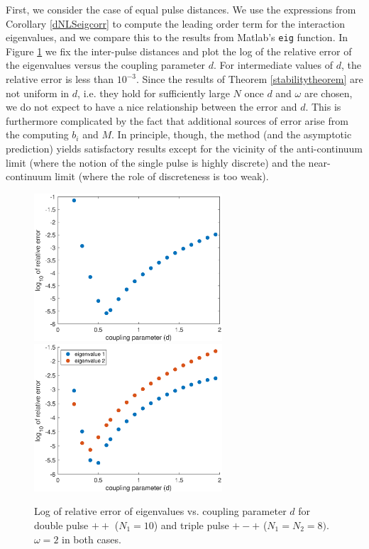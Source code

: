 \documentclass[12pt]{article}
\begin{document}
First, we consider the case of equal pulse distances. We use the expressions from Corollary \ref{dNLSeigcorr} to compute the leading order term for the interaction eigenvalues, and we compare this to the results from Matlab's \texttt{eig} function. In Figure \ref{fig:error1} we fix the inter-pulse distances and plot the log of the relative error of the eigenvalues versus the coupling parameter $d$. For intermediate values of $d$, the relative error is less than $10^{-3}$. Since the results of Theorem \eqref{stabilitytheorem} are not uniform in $d$, i.e. they hold for sufficiently large $N$ once $d$ and $\omega$ are chosen, we do not expect to have a nice relationship between the error and $d$. This is furthermore complicated by the fact that additional sources of error arise from the computing $b_i$ and $M$. In principle, though, the method (and the asymptotic prediction) yields
satisfactory results except for the vicinity of the 
anti-continuum limit (where the notion of the single
pulse is highly discrete) and the near-continuum limit
(where the role of discreteness is too weak). 

\begin{figure}[H]
\centering
\includegraphics[width=7cm]{errors1.eps}
\includegraphics[width=7cm]{errors2.eps}
\caption{Log of relative error of eigenvalues vs. coupling parameter $d$ for double pulse $++$ ($N_1 = 10$) and triple pulse $+-+$ ($N_1 = N_2 = 8)$. $\omega = 2$ in both cases.}
\label{fig:error1}
\end{figure}
\end{document}
